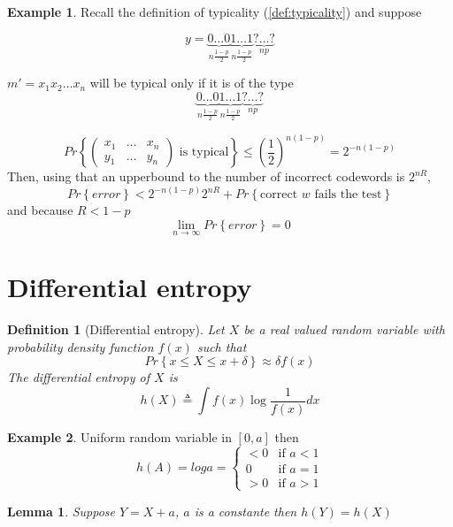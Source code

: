 \documentclass[twoside]{article}
\newtheorem{lemma}[theorem]{Lemma}
\newtheorem{definition}{Definition}[section]
\theoremstyle{definition} %
\newtheorem{example}{Example}
\renewcommand{\Pr}[1]{Pr\left\{#1\right\}}
\newcommand{\pfrac}[2]{\left( \frac{#1}{#2} \right)}
\begin{document}
\begin{example}
  Recall the definition of typicality (\cref{def:typicality}) and suppose

  \[
    y = \underbrace{0\dots0}_{n \frac{1-p} 2} \underbrace{1\dots1}_{n \frac{1-p} 2} \underbrace{?\dots?}_{np}
  \]

  $m' = x_1 x_2 \dots x_n$ will be typical only if it is of the type
  \[
    \underbrace{0\dots0}_{n \frac{1-p} 2} \underbrace{1\dots1}_{n \frac{1-p} 2} \underbrace{?\dots?}_{np}
  \]

  \[
    \Pr{
    \begin{pmatrix}
      x_1 & \dots & x_n\\
      y_1 & \dots & y_n
    \end{pmatrix}
    \text{ is typical}
    }
    \leq
    \pfrac 1 2 ^ {n(1-p)} = 2^{-n(1-p)}
  \]
  Then, using that an upperbound to the number of incorrect codewords is $2^{nR}$,
  \[
    \Pr{error} < 2^{-n(1-p)}2^{nR} + \Pr{\text{correct $w$ fails the test}}
  \]
  and because $R < 1-p$
  \[
    \lim_{n\to \infty} \Pr{error} = 0
  \]

\end{example}


\cleardoublepage
\section{Differential entropy}

\begin{definition}[Differential entropy]
  Let $X$ be a real valued random variable with probability density function $f(x)$ such that
  \[
    \Pr{x \leq X \leq x + \delta} \approx \delta f(x)
  \]
  The differential entropy of $X$ is
  \[
    h(X) \triangleq \int f(x) \log \frac 1 {f(x)} dx
  \]
\end{definition}

\begin{example}
  Uniform random variable in $[0,a]$ then \[
    h(A) = log a = \begin{cases}
      < 0 & \text{if } a < 1\\
      0 & \text{if } a = 1\\
      > 0 & \text{if } a > 1
    \end{cases}
  \]
\end{example}

\begin{lemma}
  Suppose $Y=X+a$, $a$ is a constante then $h(Y)=h(X)$
\end{lemma}
\end{document}
